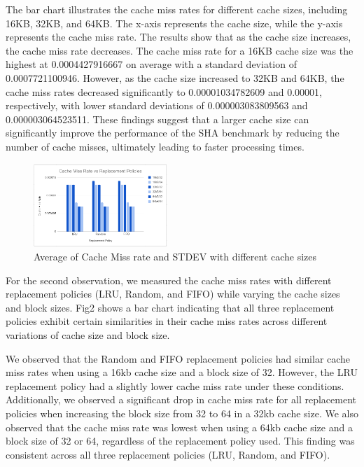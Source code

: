 \documentclass[conference]{IEEEtran}
\begin{document}
The bar chart illustrates the cache miss rates for different cache sizes, including 16KB, 32KB, and 64KB. The x-axis represents the cache size, while the y-axis represents the cache miss rate. The results show that as the cache size increases, the cache miss rate decreases. The cache miss rate for a 16KB cache size was the highest at 0.0004427916667 on average with a standard deviation of 0.0007721100946. However, as the cache size increased to 32KB and 64KB, the cache miss rates decreased significantly to 0.00001034782609 and 0.00001, respectively, with lower standard deviations of 0.000003083809563 and 0.000003064523511. These findings suggest that a larger cache size can significantly improve the performance of the SHA benchmark by reducing the number of cache misses, ultimately leading to faster processing times.

\space

\begin{figure}[H]
    \centering
    \includegraphics[width=0.45\textwidth]{sha/sha_cache_vs_repl.png}
    \caption{Average of Cache Miss rate and STDEV with different cache sizes}
\end{figure}

For the second observation, we measured the cache miss rates with different replacement policies (LRU, Random, and FIFO) while varying the cache sizes and block sizes. Fig2 shows a bar chart indicating that all three replacement policies exhibit certain similarities in their cache miss rates across different variations of cache size and block size.


We observed that the Random and FIFO replacement policies had similar cache miss rates when using a 16kb cache size and a block size of 32. However, the LRU replacement policy had a slightly lower cache miss rate under these conditions. Additionally, we observed a significant drop in cache miss rate for all replacement policies when increasing the block size from 32 to 64 in a 32kb cache size. We also observed that the cache miss rate was lowest when using a 64kb cache size and a block size of 32 or 64, regardless of the replacement policy used. This finding was consistent across all three replacement policies (LRU, Random, and FIFO).
\end{document}
